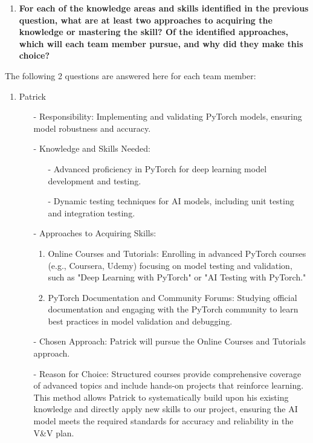 \documentclass[12pt, titlepage]{article}
\begin{document}
\begin{enumerate}
\begin{enumerate}
\begin{enumerate}
\begin{enumerate}
\begin{enumerate}
  \item \textbf{For each of the knowledge areas and skills identified in the previous
  question, what are at least two approaches to acquiring the knowledge or
  mastering the skill?  Of the identified approaches, which will each team
  member pursue, and why did they make this choice?}
\end{enumerate}
The following 2 questions are answered here for each team member:

\begin{enumerate}
  \item Patrick

  \begin{itemize}
      \item[-]Responsibility: Implementing and validating PyTorch models, ensuring model robustness and accuracy.
      \item[-] Knowledge and Skills Needed:
      \begin{itemize}
          \item[-] Advanced proficiency in PyTorch for deep learning model development and testing.
          \item[-] Dynamic testing techniques for AI models, including unit testing and integration testing.
      \end{itemize}
      \item[-] Approaches to Acquiring Skills:
      \begin{enumerate}
          \item Online Courses and Tutorials: Enrolling in advanced PyTorch courses (e.g., Coursera, Udemy) focusing on model testing and validation, such as "Deep Learning with PyTorch" or "AI Testing with PyTorch."
          \item PyTorch Documentation and Community Forums: Studying official documentation and engaging with the PyTorch community to learn best practices in model validation and debugging.
      \end{enumerate}
      \item[-] Chosen Approach: Patrick will pursue the Online Courses and Tutorials approach.
      \item[-] Reason for Choice: Structured courses provide comprehensive coverage of advanced topics and include hands-on projects that reinforce learning. This method allows Patrick to systematically build upon his existing knowledge and directly apply new skills to our project, ensuring the AI model meets the required standards for accuracy and reliability in the V\&V plan.
  \end{itemize}


\end{enumerate}
\end{enumerate}
\end{enumerate}
\end{enumerate}
\end{enumerate}
\end{document}

